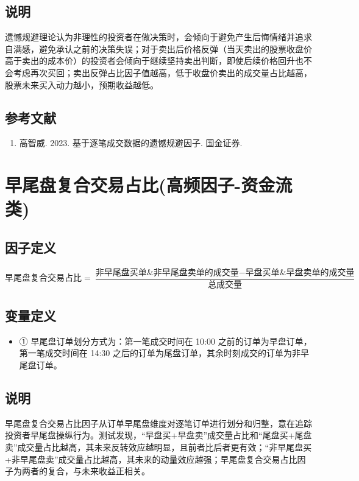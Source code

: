 \documentclass{article}
\begin{document}
\subsection{说明}
遗憾规避理论认为非理性的投资者在做决策时，会倾向于避免产生后悔情绪并追求自满感，避免承认之前的决策失误；对于卖出后价格反弹（当天卖出的股票收盘价高于卖出的成本价）的投资者会倾向于继续坚持卖出判断，即使后续价格回升也不会考虑再次买回；卖出反弹占比因子值越高，低于收盘价卖出的成交量占比越高，股票未来买入动力越小，预期收益越低。

\subsection{参考文献}
\begin{enumerate}
    \item 高智威. 2023. 基于逐笔成交数据的遗憾规避因子. 国金证券.
\end{enumerate}

\section{早尾盘复合交易占比(高频因子-资金流类)}

\subsection{因子定义}

\begin{equation}
    \text{早尾盘复合交易占比} = \frac{\text{非早尾盘买单\&非早尾盘卖单的成交量} - \text{早盘买单\&早盘卖单的成交量}}{\text{总成交量}}
\end{equation}

\subsection{变量定义}
\begin{itemize}
    \item ① 早尾盘订单划分方式为：第一笔成交时间在 10:00 之前的订单为早盘订单，第一笔成交时间在 14:30 之后的订单为尾盘订单，其余时刻成交的订单为非早尾盘订单。
\end{itemize}

\subsection{说明}
早尾盘复合交易占比因子从订单早尾盘维度对逐笔订单进行划分和归整，意在追踪投资者早尾盘操纵行为。测试发现，“早盘买+早盘卖”成交量占比和“尾盘买+尾盘卖”成交量占比越高，其未来反转效应越明显，且前者比后者更有效；“非早尾盘买+非早尾盘卖”成交量占比越高，其未来的动量效应越强；早尾盘复合交易占比因子为两者的复合，与未来收益正相关。
\end{document}

